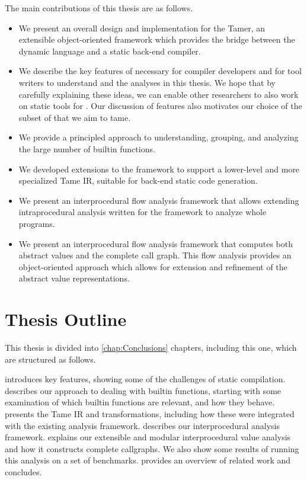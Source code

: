 The main contributions of this thesis are as follows.

\begin{itemize}
\item We present an overall design and implementation for the \matlab Tamer,
an extensible object-oriented framework
which provides the bridge between the dynamic \matlab language and a static back-end
compiler. 

\item We describe the key features of \matlab necessary for compiler developers
and for tool writers to understand \matlab and the analyses in this thesis.  We hope
that by carefully explaining these ideas, we can enable other researchers
to also work on static tools for \matlab.  Our discussion of \matlab features
also motivates our choice of the subset of \matlab that we aim to tame. 

\item We provide a principled approach to understanding, grouping, and
analyzing the large number of \matlab builtin functions.

\item We developed extensions to the \mcsaf\cite{JesseThesis} framework to support a lower-level
and more specialized Tame IR, suitable for back-end static code generation.

\item We present an interprocedural flow analysis framework that allows
 extending intraprocedural analysis written for the \mcsaf framework to
 analyze whole programs.
 
\item We present an interprocedural flow analysis framework that computes both
abstract values and the complete call graph.  This flow analysis
provides an object-oriented approach which allows for extension and
refinement of the abstract value representations.

\end{itemize}


\section{Thesis Outline}
This thesis is divided into \ref{chap:Conclusions} chapters, including this one, which are structured as follows.

 introduces key \matlab features,
showing some of the challenges of static compilation.
 describes our
approach to dealing with \matlab builtin functions, starting with some
examination of which builtin functions are relevant, and how they
behave.
 presents the Tame IR and
transformations, including how these were integrated with the existing
analysis framework.
 describes our interprocedural analysis framework.
 explains our 
extensible and modular interprocedural value analysis and how it
constructs complete callgraphs. We also show some results of running
this analysis on a set of benchmarks.
 provides an overview of related work and
 concludes.
